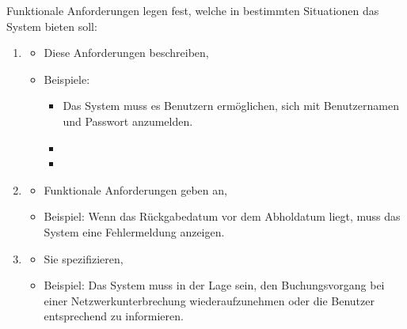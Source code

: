 \begin{infoBox}[title=Was spezifizieren funktionale Anforderungen]
    Funktionale Anforderungen legen fest, welche  in bestimmten Situationen das System bieten soll:
    \begin{enumerate}
        \item {}
        \begin{itemize}
            \item Diese Anforderungen beschreiben, 
            \item Beispiele:
            \begin{itemize}
                \item {} Das System muss es Benutzern ermöglichen, sich mit Benutzernamen und Passwort anzumelden.
                \item {}
                \item {} 
            \end{itemize}
        \end{itemize}
        \item {}
        \begin{itemize}
            \item Funktionale Anforderungen geben an, 
            \item Beispiel:  Wenn das Rückgabedatum vor dem Abholdatum liegt, muss das System eine Fehlermeldung anzeigen.
        \end{itemize}
        \item {}
        \begin{itemize}
            \item Sie spezifizieren, 
            \item Beispiel:  Das System muss in der Lage sein, den Buchungsvorgang bei einer Netzwerkunterbrechung wiederaufzunehmen oder die Benutzer entsprechend zu informieren.
        \end{itemize}
    \end{enumerate}
\end{infoBox}
